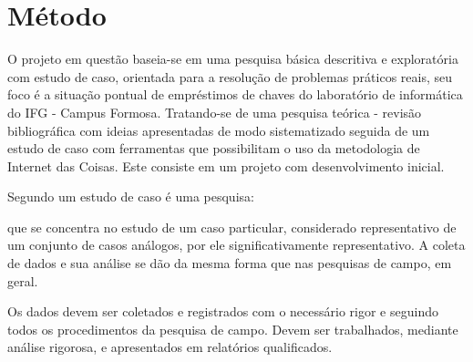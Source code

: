 \chapter{Método}
\label{Metodo}



O projeto em questão baseia-se em uma pesquisa básica descritiva e exploratória com estudo de caso, orientada para a resolução de problemas práticos reais, seu foco é a  situação pontual de empréstimos de chaves do laboratório de informática do IFG - Campus Formosa. Tratando-se de uma pesquisa teórica - revisão bibliográfica com ideias apresentadas de modo sistematizado seguida de um estudo de caso com ferramentas que possibilitam o uso da metodologia de Internet das Coisas. Este consiste em um projeto com desenvolvimento inicial. 

Segundo \citep{metodolai} um estudo de caso é uma pesquisa: 

\begin{quoting}
    que se concentra no estudo de um caso particular, considerado representativo de um conjunto de casos análogos, por ele significativamente representativo. A coleta de dados e sua análise se dão da mesma forma que nas pesquisas de campo, em geral.
    
    Os dados devem ser coletados e registrados com o necessário rigor e seguindo todos os procedimentos da pesquisa de campo. Devem ser trabalhados, mediante análise rigorosa, e apresentados em relatórios qualificados.
\end{quoting}


